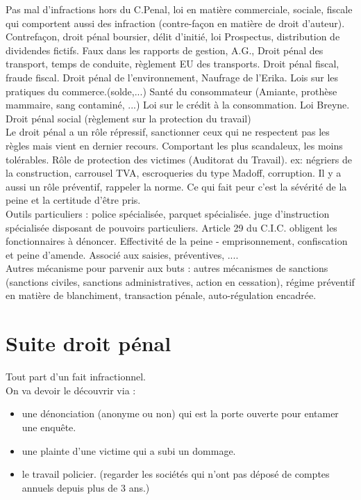 \documentclass{book}
\begin{document}
Pas mal d'infractions hors du C.Penal, loi en matière commerciale, sociale, fiscale qui comportent aussi des infraction (contre-façon en matière de droit d'auteur). Contrefaçon, droit pénal boursier, délit d'initié, loi Prospectus, distribution de dividendes fictifs. Faux dans les rapports de gestion, A.G., Droit pénal des transport, temps de conduite, règlement EU des transports. Droit pénal fiscal, fraude fiscal. Droit pénal de l'environnement, Naufrage de l'Erika. Lois sur les pratiques du commerce.(solde,...) Santé du consommateur (Amiante, prothèse mammaire, sang contaminé, ...) Loi sur le crédit à la consommation. Loi Breyne. Droit pénal social (règlement sur la protection du travail)\\


Le droit pénal a un rôle répressif, sanctionner ceux qui ne respectent pas les règles mais vient en dernier recours. Comportant les plus scandaleux, les moins tolérables. Rôle de protection des victimes (Auditorat du Travail). ex: négriers de la construction, carrousel TVA, escroqueries du type Madoff, corruption. Il y a aussi un rôle préventif, rappeler la norme. Ce qui fait peur c'est la sévérité de la peine et la certitude d'être pris.\\

Outils particuliers : police spécialisée, parquet spécialisée. juge d'instruction spécialisée disposant de pouvoirs particuliers. Article 29 du C.I.C. obligent les fonctionnaires à dénoncer. Effectivité de la peine - emprisonnement, confiscation et peine d'amende. Associé aux saisies, préventives, ....\\

Autres mécanisme pour parvenir aux buts : autres mécanismes de sanctions (sanctions civiles, sanctions administratives, action en cessation), régime préventif en matière de blanchiment, transaction pénale, auto-régulation encadrée.\\

\section{Suite droit pénal}

Tout part d'un fait infractionnel. \\

On va devoir le découvrir via :

\begin{itemize}
\item une dénonciation (anonyme ou non) qui est la porte ouverte pour entamer une enquête.
\item une plainte d'une victime qui a subi un dommage.
\item le travail policier. (regarder les sociétés qui n'ont pas déposé de comptes annuels depuis plus de 3 ans.)
\end{itemize}
\end{document}
